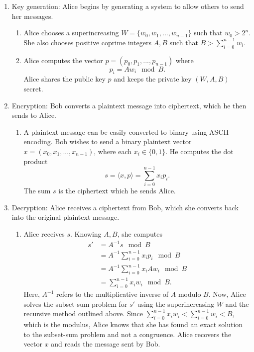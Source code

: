 \documentclass[a4paper,12pt]{article}
\begin{document}
\begin{enumerate}[label*=\arabic*.]
    \item Key generation: Alice begins by generating a system to allow others to send her messages.
    \begin{enumerate}[label*=\arabic*.]
        \item Alice chooses a superincreasing $W = \lbrace w_0, w_1, ..., w_{n-1} \rbrace$ such that $w_0 > 2^n$. She also chooses positive coprime integers $A, B$ such that $B > \sum_{i=0}^{n-1}w_i$.
        \item Alice computes the vector $p = (p_0, p_1, ..., p_{n-1})$ where $$p_i = Aw_i \mod B.$$ Alice shares the public key $p$ and keeps the private key $(W,A,B)$ secret. 
    \end{enumerate}
    \item Encryption: Bob converts a plaintext message into ciphertext, which he then sends to Alice.
    \begin{enumerate}[label*=\arabic*.]
        \item A plaintext message can be easily converted to binary using ASCII encoding. Bob wishes to send a binary plaintext vector $x = (x_0, x_1, ..., x_{n-1})$, where each $x_i \in \lbrace 0,1 \rbrace$. He computes the dot product $$s = \langle x,p\rangle = \sum_{i=0}^{n-1}x_{i}p_{i}.$$ The sum $s$ is the ciphertext which he sends Alice. 
    \end{enumerate}
    \item Decryption: Alice receives a ciphertext from Bob, which she converts back into the original plaintext message.
    \begin{enumerate}[label*=\arabic*.]
        \item Alice receives $s$. Knowing $A, B$, she computes \begin{align*}
            s' &= A^{-1}s \mod B \\
            &= A^{-1}\sum_{i=0}^{n-1}x_{i}p_{i} \mod B \\
            &= A^{-1}\sum_{i=0}^{n-1}x_{i}Aw_{i} \mod B \\
            &= \sum_{i=0}^{n-1}x_{i}w_{i} \mod B.
        \end{align*}
        Here, $A^{-1}$ refers to the multiplicative inverse of $A$ modulo $B$. Now, Alice solves the subset-sum problem for $s'$ using the superincreasing $W$ and the recursive method outlined above. Since $\sum_{i=0}^{n-1}x_{i}w_{i} < \sum_{i=0}^{n-1}w_{i} < B$, which is the modulus, Alice knows that she has found an exact solution to the subset-sum problem and not a congruence. Alice recovers the vector $x$ and reads the message sent by Bob.
    \end{enumerate}
\end{enumerate}
\end{document}
